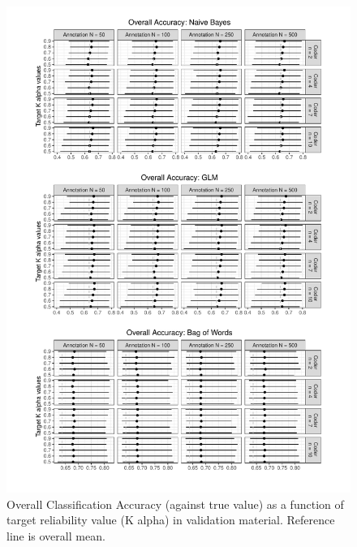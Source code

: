 \documentclass[man, 12pt, a4paper, nolmodern, noextraspace]{apa6}
\begin{document}
\begin{figure}
         \captionsetup[figure]{labelfont=bf,textfont=normalfont,singlelinecheck=on}
         \centering
         \includegraphics[trim={0cm 0cm 0cm 0cm}, clip, width=1.05\columnwidth]{Results/overall_accuracy.pdf} 
         \captionsetup{format=hang}
         \caption{Overall Classification Accuracy (against true value) as a function of target reliability value (K alpha) in validation material. Reference line is overall mean.} 
         \label{fig:Figure1}
\end{figure}    
\end{document}
